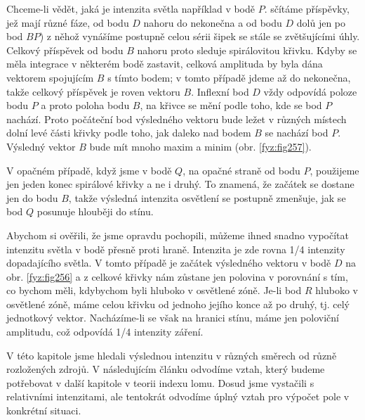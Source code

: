     Chceme-li vědět, jaká je intenzita světla například v bodě \(P\). sčítáme příspěvky, jež mají 
    různé fáze, od bodu \(D\) nahoru do nekonečna a od bodu \(D\) dolů jen po bod \(BP\)) z něhož 
    vynášíme postupně celou sérii šipek se stále se zvětšujícími úhly. Celkový příspěvek od bodu 
    \(B\) nahoru proto sleduje spirálovitou křivku. Kdyby se měla integrace v některém bodě 
    zastavit, celková amplituda by byla dána vektorem spojujícím \(B\) s tímto bodem; v tomto 
    případě jdeme až do nekonečna, takže celkový příspěvek je roven vektoru \(B\). Inflexní bod 
    \(D\) vždy odpovídá poloze bodu \(P\) a proto poloha bodu \(B\), na křivce se mění podle toho, 
    kde se bod \(P\) nachází. Proto počáteční bod výsledného vektoru bude ležet v různých místech 
    dolní levé části křivky podle toho, jak daleko nad bodem \(B\) se nachází bod \(P\). Výsledný 
    vektor \(B\) bude mít mnoho maxim a minim (obr. \ref{fyz:fig257}).
    
    
    V opačném případě, když jsme v bodě \(Q\), na opačné straně od bodu \(P\), použijeme jen jeden 
    konec spirálové křivky a ne i druhý. To znamená, že začátek se dostane jen do bodu \(B\), takže 
    výsledná intenzita osvětlení se postupně zmenšuje, jak se bod \(Q\) posunuje hlouběji do stínu.
    
    Abychom si ověřili, že jsme opravdu pochopili, můžeme ihned snadno vypočítat intenzitu světla v 
    bodě přesně proti hraně. Intenzita je zde rovna \num{1/4} intenzity dopadajícího světla. V 
    tomto případě je začátek výsledného vektoru v bodě \(D\) na obr. \ref{fyz:fig256} a z celkové 
    křivky nám zůstane jen polovina v porovnání s tím, co bychom měli, kdybychom byli hluboko v 
    osvětlené zóně. Je-li bod \(R\) hluboko v osvětlené zóně, máme celou křivku od jednoho jejího 
    konce až po druhý, tj. celý jednotkový vektor. Nacházíme-li se však na hranici stínu, máme jen 
    poloviční amplitudu, což odpovídá \num{1/4} intenzity záření.
    
    V této kapitole jsme hledali výslednou intenzitu v různých směrech od různě rozložených zdrojů. 
    V následujícím článku odvodíme vztah, který budeme potřebovat v další kapitole v teorii indexu 
    lomu. Dosud jsme vystačili s relativními intenzitami, ale tentokrát odvodíme úplný vztah pro 
    výpočet pole v konkrétní situaci.
    
